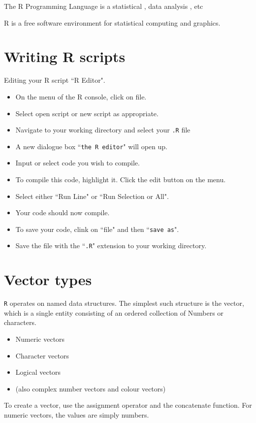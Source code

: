 \documentclass[a4paper,12pt]{article}
\begin{document}
\begin{itemize}
		The R Programming Language is a statistical , data analysis , etc
		
		R is a free software environment for statistical computing and graphics.
		
		\section{Writing R scripts}
		Editing your R script ``R Editor".
		\begin{itemize}
			\item On the menu of the R console, click on file.
			\item Select open script or new script as appropriate.
			\item Navigate to your working directory and select your \texttt{.R} file
			\item A new dialogue box ``\texttt{the R editor}" will open up.
			\item Input or select code you wish to compile.
			\item To compile this code, highlight it. Click the edit button on the menu.
			\item Select either ``Run Line" or ``Run Selection or All".
			\item Your code should now compile.
			\item To save your code, clink on ``file" and then ``\texttt{save as}".
			\item Save the file with the ``\texttt{.R}" extension to your working directory.
		\end{itemize}
		
		\section{Vector types}
		\texttt{R} operates on named data structures. The simplest such structure is the
		vector, which is a single entity consisting of an ordered collection of
		Numbers or characters.
		
		\begin{itemize}
			\item Numeric vectors
			\item Character vectors
			\item Logical vectors
			\item (also complex number vectors and colour vectors)
		\end{itemize}
		
		To create a vector, use the assignment operator and the concatenate function.
		For numeric vectors, the values are simply numbers.
		

\end{itemize}
\end{document}
